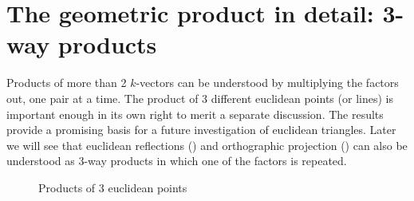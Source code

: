 \documentclass[12pt]{article}
\begin{document}
 \section{The geometric product in detail: 3-way products}
\label{sec:threes}
Products of more than 2 $k$-vectors can be understood by multiplying the factors out, one pair at a time.  The product of 3 different euclidean points (or lines) is important enough in its own right to merit a separate discussion. The results provide a promising basis for  a future investigation of euclidean triangles.  Later we will see that euclidean reflections () and orthographic projection () can also be understood as 3-way products in which one of the factors is repeated.

  \begin{figure}
   \centering
{\setlength\fboxsep{0pt}}\hspace{.03in}
\caption{Products of 3 euclidean points}
\label{fig:trianglepts}
\end{figure}

\end{document}
